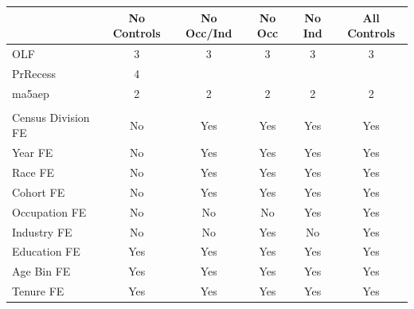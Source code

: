 \begin{tabular}{lccccc}
\hline\hline
  & No Controls & No Occ/Ind & No Occ & No Ind & All Controls \\
\hline
OLF&3&3&3&3&3\\
PrRecess&4&&&&\\
ma5aep&2&2&2&2&2\\
\hline
\multicolumn{6}{l}{} \\
Census Division FE & No & Yes & Yes & Yes & Yes \\
Year FE & No & Yes & Yes & Yes & Yes \\
Race FE & No & Yes & Yes & Yes & Yes \\
Cohort FE & No & Yes & Yes & Yes & Yes \\
Occupation FE & No & No & No & Yes & Yes \\
Industry FE & No & No & Yes & No & Yes \\
Education FE & Yes & Yes & Yes & Yes & Yes \\
Age Bin FE & Yes & Yes & Yes & Yes & Yes \\
Tenure FE & Yes & Yes & Yes & Yes & Yes \\
\hline\hline
\end{tabular}
